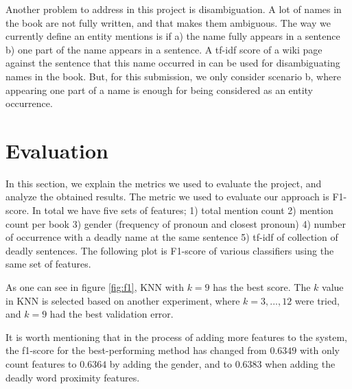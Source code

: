 \documentclass[letterpaper]{article}
\begin{document}

Another problem to address in this project is disambiguation. A lot of names in the book are not fully written, and that makes them ambiguous. The way we currently define an entity mentions is if a) the name fully appears in a sentence b) one part of the name appears in a sentence. A tf-idf score of a wiki page against the sentence that this name occurred in can be used for disambiguating names in the book. But, for this submission, we only consider scenario b, where appearing one part of a name is enough for being considered as an entity occurrence.








\section{Evaluation}

In this section, we explain the metrics we used to evaluate the project, and analyze the  obtained results. The metric we used to evaluate our approach is F1-score. In total we have five sets of features; 1) total mention count 2) mention count per book 3) gender (frequency of pronoun and closest pronoun) 4) number of occurrence with a deadly name at the same sentence 5) tf-idf of collection of deadly sentences. The following plot is F1-score of various classifiers using the same set of features.

As one can see in figure \ref{fig:f1}, KNN with $k=9$ has the best score. The $k$ value in KNN is selected based on another experiment, where $k=3,..., 12$ were tried, and $k=9$ had the best validation error.

It is worth mentioning that in the process of adding more features to the system, the f1-score for the best-performing method has changed from $0.6349$ with only count features to $0.6364$ by adding the gender, and to $0.6383$ when adding the deadly word proximity features.
\end{document}
